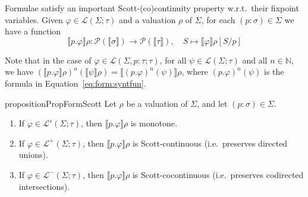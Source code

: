 \documentclass[%
  a4paper,
  UKenglish,
  cleveref,
  autoref,
  thm-restate,
  numberwithinsect,
]{lipics-v2021}
\newcommand\longto\longrightarrow
\newcommand\Po{\mathcal{P}}		%
\newcommand\NN{\mathbb{N}}
\newcommand\I[1]{\llbracket #1 \rrbracket} %
\newcommand\SP{S}			%
\newcommand\val{\rho}	%
\newcommand\PT{\tau}		%
\newcommand\PTbis{\sigma}	%
\newcommand\FP{p}
\newcommand\FPEnv{\Sigma}
\newcommand\Lang{\mathcal{L}}
\newcommand\sign{s}
\begin{document}
Formulae satisfy an important Scott-(co)continuity property
w.r.t.\ their fixpoint variables.
%
Given $\varphi \in \Lang(\FPEnv;\PT)$ and a valuation $\val$ of $\FPEnv$,
for each $(\FP \colon \PTbis) \in \FPEnv$
we have a function
\[
  \I{\FP.\varphi}\val \colon
  \Po(\I{\PTbis})
  \longto
  \Po(\I\PT)
  ,\quad
  \SP
  \longmapsto
  \I{\varphi}\val[\SP/\FP]
\]

\noindent
Note that in the case of
$\varphi \in \Lang(\FPEnv,\FP \colon \PT;\PT)$,
for all $\psi \in \Lang(\FPEnv;\PT)$ and all $n \in \NN$,
we have
$(\I{\FP.\varphi}\val)^n(\I\psi\val) = \I{(\FP.\varphi)^n(\psi)}\val$,
where
$(\FP.\varphi)^n(\psi)$ is the formula in Equation~\eqref{eq:form:syntfun}.

\begin{restatable}{proposition}{PropFormScott}
\label{prop:sem:log:scott}
Let $\val$ be a valuation of $\FPEnv$, and let $(\FP \colon \PTbis) \in \FPEnv$.
\begin{enumerate}[(1)]
\item
\label{item:sem:log:scott:mon}
If $\varphi \in \Lang^\sign(\FPEnv;\PT)$,
then $\I{\FP.\varphi}\val$ is monotone.

\item
\label{item:sem:log:scott:pos}
If $\varphi \in \Lang^+(\FPEnv;\PT)$,
then $\I{\FP.\varphi}\val$ is Scott-continuous
(i.e.\ preserves directed unions).

\item
\label{item:sem:log:scott:neg}
If $\varphi \in \Lang^-(\FPEnv;\PT)$,
then $\I{\FP.\varphi}\val$ is Scott-cocontinuous
(i.e.\ preserves codirected intersections).
\end{enumerate}
\end{restatable}
\end{document}

